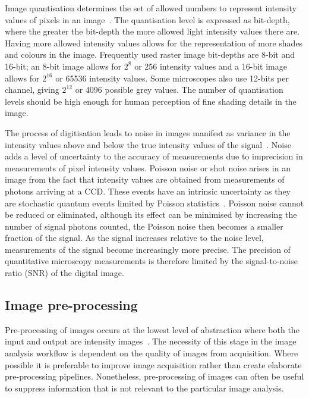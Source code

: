 Image quantisation determines the set of allowed numbers to represent intensity values of pixels in an image~\cite{Pawley2006}. The quantisation level is expressed as bit-depth, where the greater the bit-depth the more allowed light intensity values there are. Having more allowed intensity values allows for the representation of more shades and colours in the image. Frequently used raster image bit-depths are 8-bit and 16-bit; an 8-bit image allows for $2^{8}$ or 256 intensity values and a 16-bit image allows for $2^{16}$ or 65536 intensity values. Some microscopes also use 12-bits per channel, giving $2^{12}$ or 4096 possible grey values. The number of quantisation levels should be high enough for human perception of fine shading details in the image.

The process of digitisation leads to noise in images manifest as variance in the intensity values above and below the true intensity values of the signal~\cite{Waters2009}. Noise adds a level of uncertainty to the accuracy of measurements due to imprecision in measurements of pixel intensity values. Poisson noise or shot noise arises in an image from the fact that intensity values are obtained from measurements of photons arriving at a CCD. These events have an intrinsic uncertainty as they are stochastic quantum events limited by Poisson statistics~\cite{Pawley2000}. Poisson noise cannot be reduced or eliminated, although its effect can be minimised by increasing the number of signal photons counted, the Poisson noise then becomes a smaller fraction of the signal. As the signal increases relative to the noise level, measurements of the signal become increasingly more precise. The precision of quantitative microscopy measurements is therefore limited by the signal-to-noise ratio (SNR) of the digital image.

\subsection{Image pre-processing}
\label{introduction:image_processing:image_pre-processing}
Pre-processing of images occurs at the lowest level of abstraction where both the input and output are intensity images~\cite{Sonka2007}. The necessity of this stage in the image analysis workflow is dependent on the quality of images from acquisition. Where possible it is preferable to improve image acquisition rather than create elaborate pre-processing pipelines. Nonetheless, pre-processing of images can often be useful to suppress information that is not relevant to the particular image analysis.

